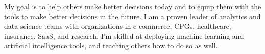 \begin {cvsummary}

My goal is to help others make better decisions today and to equip them with the tools to make better decisions in the future. I am a proven leader of analytics and data science teams with organizations in e-commerce, CPGs, healthcare, insurance, SaaS, and research. I'm skilled at deploying machine learning and artificial intelligence tools, and teaching others how to do so as well. 

\vspace{1mm}
\end {cvsummary}
